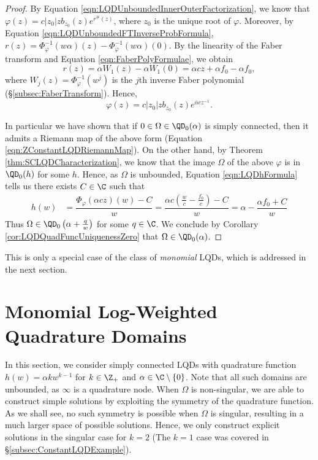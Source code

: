 \documentclass{article}
\numberwithin{equation}{section}
\begin{document}
\begin{proof}
By Equation \ref{eqn:LQDUnboundedInnerOuterFactorization}, we know that $\varphi(z)=c|z_0|zb_{z_0}(z)e^{r^{\#}(z)}$, where $z_0$ is the unique root of $\varphi$. Moreover, by Equation \ref{eqn:LQDUnboundedFTInverseProbFormula},
$r(z)=\Phi_{\varphi}^{-1}\left(w\alpha\right)(z)-\Phi_{\varphi}^{-1}\left(w\alpha\right)(0)$. By the linearity of the Faber transform and Equation \ref{eqn:FaberPolyFormulae}, we obtain
$$r(z)=\alpha W_1(z)-\alpha W_1(0)=\alpha cz+\alpha f_0-\alpha f_0,$$
where $W_j(z)=\Phi_{\varphi}^{-1}(w^j)$ is the $j$th inverse Faber polynomial (\S\ref{subsec:FaberTransform}). Hence,
$$\varphi(z)=c|z_0|zb_{z_0}(z)e^{\overline{\alpha}cz^{-1}}.$$

In particular we have shown that if $0\in\Omega\in\QD_0(\alpha)$ is simply connected, then it admits a Riemann map of the above form (Equation \ref{eqn:ZConstantLQDRiemannMap}). On the other hand, by Theorem \ref{thm:SCLQDCharacterization}, we know that the image $\Omega$ of the above $\varphi$ is in $\QD_0(h)$ for some $h$. Hence, as $\Omega$ is unbounded, Equation \ref{eqn:LQDhFormula} tells us there exists $C\in\C$ such that
\begin{align*}
    h(w)&=\dfrac{\Phi_{\varphi}\left(\alpha cz\right)(w)-C}{w}=\dfrac{\alpha c\left(\frac{w}{c}-\frac{f_0}{c}\right)-C}{w}=\alpha-\dfrac{\alpha f_0+C}{w}
\end{align*}
Thus $\Omega\in\QD_0\left(\alpha+\frac{q}{w}\right)$ for some $q\in\C$. We conclude by Corollary \ref{cor:LQDQuadFuncUniquenessZero} that $\Omega\in\QD_0(\alpha)$.
\end{proof}

\noindent This is only a special case of the class of \emph{monomial} LQDs, which is addressed in the next section.


\section{Monomial Log-Weighted Quadrature Domains}\label{sec:MonomialLQDs}
In this section, we consider simply connected LQDs with quadrature function $h(w)=\alpha k w^{k-1}$ for $k\in\Z_{+}$ and $\alpha\in\C\setminus\{0\}$. Note that all such domains are unbounded, as $\infty$ is a quadrature node.  When $\Omega$ is non-singular, we are able to construct simple solutions by exploiting the symmetry of the quadrature function. As we shall see, no such symmetry is possible when $\Omega$ is singular, resulting in a much larger space of possible solutions. Hence, we only construct explicit solutions in the singular case for $k=2$ (The $k=1$ case was covered in \S\ref{subsec:ConstantLQDExample}).
\end{document}
